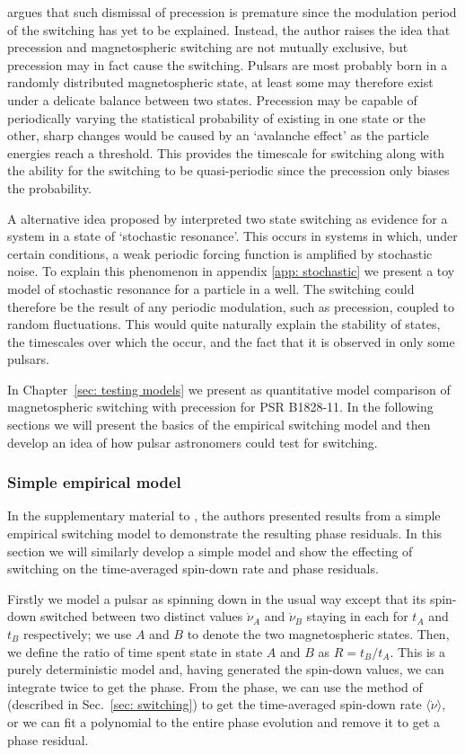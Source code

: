 \citet{Jones2012} argues that such dismissal of precession is premature since
the modulation period of the switching has yet to be explained.  Instead, the
author raises the idea that precession and magnetospheric switching are not
mutually exclusive, but precession may in fact cause the switching. Pulsars are
most probably born in a randomly distributed magnetospheric state, at least
some may therefore exist under a delicate balance between two states.
Precession may be capable of periodically varying the statistical probability
of existing in one state or the other, sharp changes would be caused by an
`avalanche effect' as the particle energies reach a threshold.  This provides
the timescale for switching along with the ability for the switching to be
quasi-periodic since the precession only biases the probability.

A alternative idea proposed by \citet{Cordes2013} interpreted two state
switching as evidence for a system in a state of `stochastic resonance'.  This
occurs in systems in which, under certain conditions, a weak periodic forcing
function is amplified by stochastic noise. To explain this phenomenon in
appendix \ref{app: stochastic} we present a toy model of stochastic resonance
for a particle in a well. The switching could therefore be the result of any
periodic modulation, such as precession, coupled to random fluctuations. This
would quite naturally explain the stability of states, the timescales over
which the occur, and the fact that it is observed in only some pulsars.

In Chapter~\ref{sec: testing models} we present as quantitative
model comparison of magnetospheric switching with precession for PSR B1828-11.
In the following sections we will present the basics of the empirical switching
model and then develop an idea of how pulsar astronomers could test for switching.

\subsubsection{Simple empirical model}

In the supplementary material to \citet{Lyne2010}, the authors presented
results from a simple empirical switching model to demonstrate the resulting
phase residuals. In this section we will similarly develop a simple model and
show the effecting of switching on the time-averaged spin-down rate and phase
residuals.

Firstly we model a pulsar as spinning down in the usual way except that its
spin-down switched between two distinct values $\dot{\nu}_{A}$ and $\dot{\nu}_{B}$
staying in each for $t_A$ and $t_B$ respectively; we use
$A$ and $B$ to denote the two magnetospheric states. Then, we
define the ratio of time spent state in state $A$ and $B$ as $R =
t_{B}/t_{A}$.  This is a purely deterministic model and, having generated the
spin-down values, we can integrate twice to get the phase. From the phase, we can
use the method of \citet{Lyne2010} (described in Sec.~\ref{sec: switching})
to get the time-averaged spin-down rate $\langle\dot{\nu}\rangle$, or we can
fit a polynomial to the entire phase evolution and remove it to get a phase
residual.


